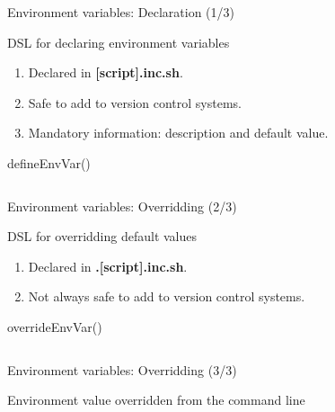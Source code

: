 \documentclass{beamer}
\begin{document}
\begin{frame}[fragile]{Environment variables: Declaration (1/3)}
  \begin{block}{DSL for declaring environment variables}
    \begin{enumerate}
    \item Declared in \textbf{[script].inc.sh}.
    \item Safe to add to version control systems.
    \item Mandatory information: description and default value.
    \end{enumerate}
  \end{block}
  \begin{block}{defineEnvVar()}
    \inputminted{bash}{defineenvvar.bash}
  \end{block}
\end{frame}

\begin{frame}[fragile]{Environment variables: Overridding (2/3)}
  \begin{block}{DSL for overridding default values}
    \begin{enumerate}
    \item Declared in \textbf{.[script].inc.sh}.
    \item Not always safe to add to version control systems.
    \end{enumerate}
  \end{block}
  \begin{block}{overrideEnvVar()}
    \inputminted{bash}{overrideenvvar.bash}
  \end{block}
\end{frame}

\begin{frame}[fragile]{Environment variables: Overridding (3/3)}
  \begin{block}{Environment value overridden from the command line}
    \inputminted{bash}{specifyenvvarcommandline.bash}
  \end{block}
\end{frame}
\end{document}
